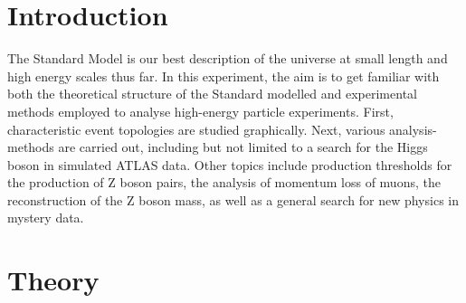 \documentclass[twoside,        %
               BCOR12mm,       %
               ngerman,english, %
               fleqn,headsepline=false,footsepline=false
              ]{Vorlage/MFPREPORT}
\begin{document}
\date{\today}
\CopyNotWanted

\maketitle


\tableofcontents

\clearpage
{}

\section{Introduction}
\label{sec:introduction}
The Standard Model is our best description of the universe at small length and
high energy scales thus far. In this experiment, the aim is to get familiar
with both the theoretical structure of the Standard modelled and experimental
methods employed to analyse high-energy particle experiments. First,
characteristic event topologies are studied graphically. Next, various
analysis-methods are carried out, including but not limited to a search for the Higgs
boson in simulated ATLAS data. Other topics include production thresholds for
the production of Z boson pairs, the analysis of momentum loss of muons, the
reconstruction of the Z boson mass, as well as a general search for new physics
in mystery data.
\newpage
\section{Theory}
\label{sec:theory}
\end{document}
